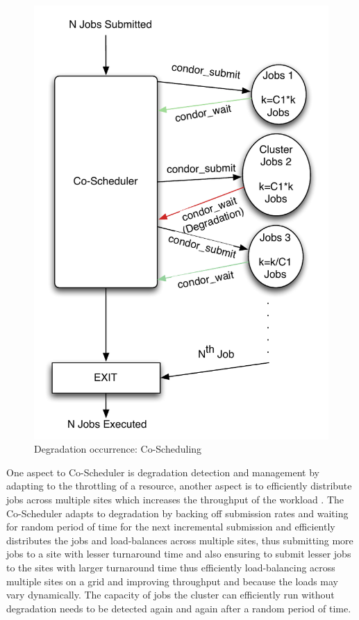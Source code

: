 \documentclass[ms,electronic,double]{nuthesis}
\begin{document}
\begin{figure}[htbp!]
\begin{center}
\includegraphics[scale=0.75]{images/degradation_detection}
\caption{Degradation occurrence: Co-Scheduling}
\label{fig:degradationdetect-intro}
\end{center}
\end{figure}

One aspect to Co-Scheduler is degradation detection and management by adapting 
to the throttling of a resource, another aspect is to efficiently distribute jobs 
across multiple sites which increases the throughput of the workload
. The Co-Scheduler adapts to degradation by backing off submission rates and waiting for random
period of time for the next incremental submission and efficiently 
distributes the jobs and load-balances across multiple sites, thus submitting more 
jobs to a site with lesser turnaround time and also ensuring to submit lesser 
jobs to the sites with larger turnaround time thus efficiently load-balancing 
across multiple sites on a grid and improving throughput and because the loads may vary dynamically. 
The capacity of jobs the cluster can efficiently run without degradation needs to be detected again and 
again after a random period of time.
\end{document}

